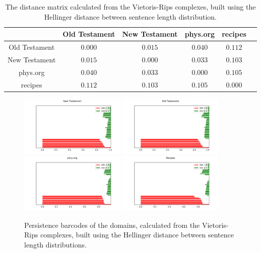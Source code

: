 \documentclass[12pt,a4paper]{amsart}
\begin{document}
\begin{table}
  \centering
  \begin{tabular}{c|ccccc}
                  & Old Testament & New Testament & phys.org & recipes \\ \hline
    Old Testament & $0.000$ & $0.015$ & $0.040$ & $0.112$ \\
    New Testament & $0.015$ & $0.000$ & $0.033$ & $0.103$ \\
    phys.org      & $0.040$ & $0.033$ & $0.000$ & $0.105$ \\
    recipes       & $0.112$ & $0.103$ & $0.105$ & $0.000$ \\
  \end{tabular}

  \caption{The distance matrix calculated from the Vietoris-Rips complexes,
    built using the Hellinger distance between sentence length distribution.}
  \label{tab:hell}
\end{table}

\begin{figure}
  \centering
  \includegraphics[width=0.45\textwidth]{../plots/barcodes/bible-new-hell}
  \includegraphics[width=0.45\textwidth]{../plots/barcodes/bible-old-hell}
  \includegraphics[width=0.45\textwidth]{../plots/barcodes/phys-hell}
  \includegraphics[width=0.45\textwidth]{../plots/barcodes/recipes-hell}
  \caption{Persistence barcodes of the domains, calculated from the
    Vietoris-Rips complexes, built using the Hellinger distance between sentence
    length distributions.}
  \label{fig:barcode:hell}
\end{figure}
\end{document}
